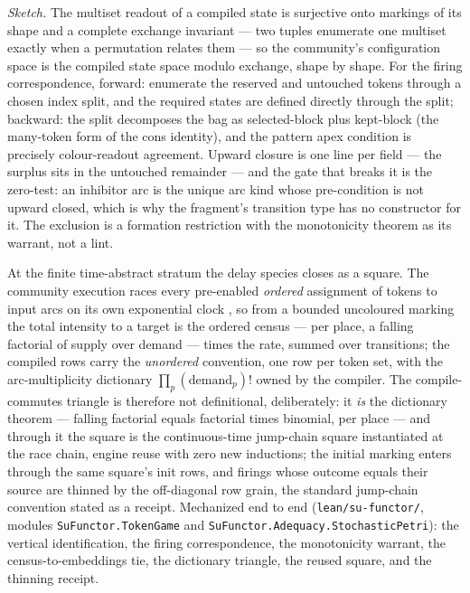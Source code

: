 \emph{Sketch.} The multiset readout of a compiled state is surjective
onto markings of its shape and a complete exchange invariant --- two
tuples enumerate one multiset exactly when a permutation relates them
--- so the community's configuration space is the compiled state
space modulo exchange, shape by shape.  For the firing
correspondence, forward: enumerate the reserved and untouched tokens
through a chosen index split, and the required states are defined
directly through the split; backward: the split decomposes the bag as
selected-block plus kept-block (the many-token form of the cons
identity), and the pattern apex condition is precisely colour-readout
agreement.  Upward closure is one line per field --- the surplus
sits in the untouched remainder --- and the gate that breaks it is
the
zero-test: an inhibitor arc is the unique arc kind whose pre-condition
is not upward closed, which is why the fragment's transition type has
no constructor for it.  The exclusion is a formation restriction with
the monotonicity theorem as its warrant, not a lint.

At the finite time-abstract stratum the delay species closes as a
square.  The community execution races every pre-enabled
\emph{ordered} assignment of tokens to input arcs on its own
exponential clock \cite{everdij-blom-2010}, so from a bounded
uncoloured marking the total intensity to a target is the ordered
census --- per place, a falling factorial of supply over demand ---
times the rate, summed over transitions; the compiled rows carry the
\emph{unordered} convention, one row per token set, with the
arc-multiplicity dictionary $\prod_p (\text{demand}_p)!$ owned by the
compiler.  The compile-commutes triangle is therefore not
definitional, deliberately: it \emph{is} the dictionary theorem ---
falling factorial equals factorial times binomial, per place --- and
through it the square is the continuous-time jump-chain square
instantiated at the race chain, engine reuse with zero new
inductions; the initial marking enters through the same square's
init rows,
and firings whose outcome equals their source are thinned by the
off-diagonal row grain, the standard jump-chain convention stated as
a receipt.  Mechanized end to end (\texttt{lean/su-functor/}, modules
\texttt{SuFunctor.TokenGame} and
\texttt{SuFunctor.Adequacy.StochasticPetri}): the vertical
identification, the firing correspondence, the monotonicity warrant,
the census-to-embeddings tie, the dictionary triangle, the reused
square, and the thinning receipt.

